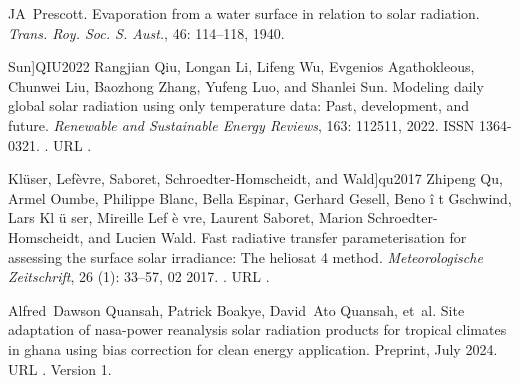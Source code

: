 \documentclass[letterpaper,12pt, twoside]{report}
\providecommand{\DIFdeltex}[1]{{\protect\color{red} \scriptsize #1}} %
\providecommand{\DIFdel}[1]{\texorpdfstring{\DIFdeltex{#1}}{}} %
\begin{document}
\DIFdel{JA~Prescott.
}%
\DIFdel{Evaporation from a water surface in relation to solar radiation.
}%
\DIFdel{\emph{Trans. Roy. Soc. S. Aust.}, 46:}%
\DIFdel{114--118, 1940.
}%

  Sun]{QIU2022}
\DIFdel{Rangjian Qiu, Longan Li, Lifeng Wu, Evgenios Agathokleous, Chunwei Liu,
  Baozhong Zhang, Yufeng Luo, and Shanlei Sun.
}%
\DIFdel{Modeling daily global solar radiation using only temperature data:
  Past, development, and future.
}%
\DIFdel{\emph{Renewable and Sustainable Energy Reviews}, 163:}%
\DIFdel{112511, 2022.
}%
\DIFdel{ISSN 1364-0321.
}%
\DIFdel{.
}%
\DIFdel{URL
  }%
\DIFdel{.
}%

  Kl{\"u}ser, Lef{\`e}vre, Saboret, Schroedter-Homscheidt, and Wald]{qu2017}
\DIFdel{Zhipeng Qu, Armel Oumbe, Philippe Blanc, Bella Espinar, Gerhard Gesell,
  Beno}%
\DIFdel{\^i}%
\DIFdel{t Gschwind, Lars Kl}%
\DIFdel{\"u}%
\DIFdel{ser, Mireille Lef}%
\DIFdel{\`e}%
\DIFdel{vre, Laurent Saboret,
  Marion Schroedter-Homscheidt, and Lucien Wald.
}%
\DIFdel{Fast radiative transfer parameterisation for assessing the surface
  solar irradiance: The heliosat 4 method.
}%
\DIFdel{\emph{Meteorologische Zeitschrift}, 26}%
\DIFdel{(1):}%
\DIFdel{33--57,
  02 2017.
}%
\DIFdel{.
}%
\DIFdel{URL }%
\DIFdel{.
}%

\DIFdel{Alfred~Dawson Quansah, Patrick Boakye, David~Ato Quansah, et~al.
}%
\DIFdel{Site adaptation of nasa-power reanalysis solar radiation products for
  tropical climates in ghana using bias correction for clean energy
  application.
}%
\DIFdel{Preprint, July 2024.
}%
\DIFdel{URL }%
\DIFdel{.
}%
\DIFdel{Version 1.
}%
\end{document}
